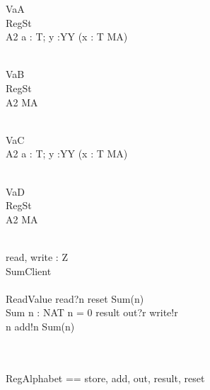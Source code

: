 \documentclass{llncs}
\begin{document}
\begin{circus}
\circprocess VaA \circdef\\
	\circbegin \circstate RegSt \\
	A2 \circdef a : T; y :YY \circspot \Skip
	\circspot (\circvar x : T \circspot MA) \\
	\circend\\
\end{circus}
\begin{circus}
\circprocess VaB \circdef\\
	\circbegin \circstate RegSt  \land [x : T]\\
	A2 \circdef \Skip
	\circspot MA \\
	\circend\\
\end{circus}
\begin{circus}
\circprocess VaC \circdef\\
	\circbegin
	A2 \circdef a : T; y :YY \circspot \Skip
	\circspot (\circvar x : T \circspot MA) \\
	\circend\\
\end{circus}
\begin{circus}
\circprocess VaD \circdef\\
	\circbegin \circstate RegSt \\
	A2 \circdef \Skip
	\circspot MA \\
	\circend\\
\end{circus}
\begin{circus}
\circchannel read, write : Z\\
\circprocess SumClient \circdef\\
	\circbegin\\
	ReadValue \circdef read?n \then reset \then Sum(n)\\
	Sum \circdef n : NAT \circspot \lcircguard n = 0 \rcircguard \circguard result \then out?r \then write!r \then \Skip\\
	\extchoice \lcircguard n  \rcircguard \circguard add!n \then Sum(n)\\
\circspot \Skip\\
	\circend\\
\end{circus}
\begin{circus}
\circchannelset RegAlphabet == \lchanset store, add, out, result, reset \rchanset\\
\end{circus}
\end{document}
